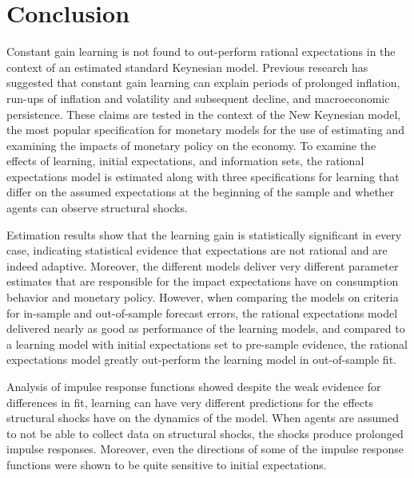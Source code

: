 \documentclass[11pt]{article}
\begin{document}
\section{Conclusion}

Constant gain learning is not found to out-perform rational expectations in the context of an estimated standard Keynesian model.  Previous research has suggested that constant gain learning can explain periods of prolonged inflation, run-ups of inflation and volatility and subsequent decline, and macroeconomic persistence.  These claims are tested in the context of the New Keynesian model, the most popular specification for monetary models for the use of estimating and examining the impacts of monetary policy on the economy.  To examine the effects of learning, initial expectations, and information sets, the rational expectations model is estimated along with three specifications for learning that differ on the assumed expectations at the beginning of the sample and whether agents can observe structural shocks.

Estimation results show that the learning gain is statistically significant in every case, indicating statistical evidence that expectations are not rational and are indeed adaptive.  Moreover, the different models deliver very different parameter estimates that are responsible for the impact expectations have on consumption behavior and monetary policy.  However, when comparing the models on criteria for in-sample and out-of-sample forecast errors, the rational expectations model delivered nearly as good as performance of the learning models, and compared to a learning model with initial expectations set to pre-sample evidence, the rational expectations model greatly out-perform the learning model in out-of-sample fit.

Analysis of impulse response functions showed despite the weak evidence for differences in fit, learning can have very different predictions for the effects structural shocks have on the dynamics of the model.  When agents are assumed to not be able to collect data on structural shocks, the shocks produce prolonged impulse responses.  Moreover, even the directions of some of the impulse response functions were shown to be quite sensitive to initial expectations.

\newpage
\begin{singlespace}
\nocite{*}


\end{singlespace}

\newpage











\end{document}
